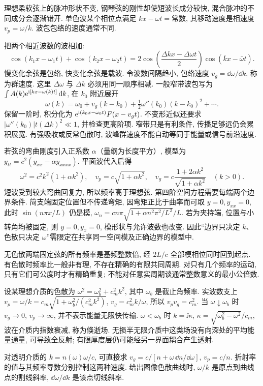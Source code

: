 \label{ch:disp}
理想柔软弦上的脉冲形状不变, 钢琴弦的刚性却使短波长成分较快, 混合脉冲的不同成分会逐渐错开. 单色波某个相位点满足 $kx-\omega t=\text{常数}$, 其移动速度是相速度 $v_p=\omega/k$. 波包包络的速度通常不同.

把两个相近波数的波相加:
\[
\cos(k_1x-\omega_1t)+\cos(k_2x-\omega_2t)
=2\cos\left(\frac{\Delta k x-\Delta\omega t}{2}\right)
\cos(\bar kx-\bar\omega t).
\]
慢变化余弦是包络, 快变化余弦是载波. 令波数间隔趋小, 包络速度 $v_g=\dd\omega/\dd k$, 称为群速度. 这里 $\Delta\omega$ 与 $\Delta k$ 必须用同一顺序相减. 一般窄带波包写为 $\int A(k)\mathrm e^{\mathrm i[kx-\omega(k)t]}\,\mathrm d k$, 在 $k_0$ 附近展开
\[
\omega(k)=\omega_0+v_g(k-k_0)+\tfrac12\omega''(k_0)(k-k_0)^2+\cdots.
\]
保留一阶时, 积分化为 $\mathrm e^{\mathrm i(k_0x-\omega_0t)}F(x-v_gt)$. 不变形近似还要求 $|\omega''(k_0)|t(\Delta k)^2\ll1$, 并检查更高阶项. 窄带只是有利条件, 传播足够远仍会累积展宽. 有强吸收或反常色散时, 波峰群速度不能自动等同于能量或信号前沿速度.

若弦的弯曲刚度引入正系数 $\alpha$（量纲为长度平方）, 模型为 $y_{tt}=c^2(y_{xx}-\alpha y_{xxxx})$. 平面波代入后得
\[
\omega^2=c^2k^2(1+\alpha k^2),\quad
v_p=c\sqrt{1+\alpha k^2},\quad
v_g=c\frac{1+2\alpha k^2}{\sqrt{1+\alpha k^2}}\quad(k>0).
\]
短波受到较大弯曲回复力, 所以频率高于理想弦. 第四阶空间方程需要每端两个边界条件. 简支端固定位置但不传递弯矩, 因弯矩正比于曲率而可取 $y=0,y_{xx}=0$, 此时 $\sin(n\pi x/L)$ 仍是模, $\omega_n=cn\pi\sqrt{1+\alpha n^2\pi^2/L^2}/L$. 若为夹持端, 位置与小转角均被固定, 则 $y=0,y_x=0$, 模形状与允许波数也改变. 因此“边界只决定 $k$、色散只决定 $\omega$”需限定在共享同一空间模及正确边界的模型中.

无色散两端固定弦的所有频率是基频整数倍, 经 $2L/c$ 全部模相位同时回到起点. 有色散时频率比一般非有理, 不存在精确的有限共同周期. 对只有几个频率的运动, 只有它们可公度时才有精确重复; 不能对任意实周期谈通常整数意义的最小公倍数.

设某理想介质的色散为 $\omega^2=\omega_b^2+c_m^2k^2$, 其中 $\omega_b$ 是截止角频率. 实波数支上 $v_p=\omega/k=c_m\sqrt{1+\omega_b^2/(c_m^2k^2)}$, $v_g=c_m^2k/\omega$, 所以 $v_pv_g=c_m^2$. 当 $\omega\downarrow\omega_b$ 时 $v_g\to0$, $v_p\to\infty$, 并不表示能量无限快传输. $\omega<\omega_b$ 时 $k=\ii\kappa$, $\kappa=\sqrt{\omega_b^2-\omega^2}/c_m$, 波在介质内指数衰减, 称为倏逝场. 无损半无限介质中这类场没有向深处的平均能量通量, 可导致全反射; 有限厚度层仍可能经另一界面耦合产生透射.

对透明介质的 $k=n(\omega)\omega/c$, 可直接求 $v_g=c/[n+\omega\,\dd n/\dd\omega]$, $v_p=c/n$. 折射率的值与其频率导数分别控制这两种速度. 给出图像色散曲线时, $\omega/k$ 是原点到曲线点的割线斜率, $\dd\omega/\dd k$ 是该点切线斜率.
